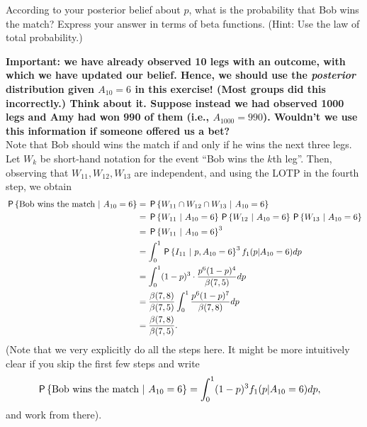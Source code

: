 \documentclass[assignments]{subfiles}
\begin{document}
\begin{exercise}
According to your posterior belief about $p$, what is the probability that Bob wins the match? Express your answer in terms of beta functions. (Hint: Use the law of total probability.)
\begin{solution}
\textbf{Important: we have already observed 10 legs with an outcome, with which we have updated our belief. Hence, we should use the \textit{posterior} distribution given $A_{10} = 6$ in this exercise! (Most groups did this incorrectly.) Think about it. Suppose instead we had observed 1000 legs and Amy had won 990 of them (i.e., $A_{1000} = 990$). Wouldn't we use this information if someone offered us a bet?}\\
Note that Bob should wins the match if and only if he wins the next three legs. Let $W_k$ be short-hand notation for the event ``Bob wins the $k$th leg''. Then, observing that $W_{11},W_{12},W_{13}$ are independent, and using the LOTP in the fourth step, we obtain
\begin{align}
    \P{ \text{Bob wins the match} \ | \ A_{10} = 6 } &= \P{ W_{11} \cap W_{12} \cap W_{13} \ | \ A_{10} = 6 } \\
    &= \P{ W_{11} \ | \ A_{10} = 6} \P{ W_{12} \ | \ A_{10} = 6} \P{ W_{13} \ | \ A_{10} = 6} \\
    &= \P{ W_{11} \ | \ A_{10} = 6}^3 \\
    &= \int_{0}^1 \P{ I_{11} \ | \ p,  A_{10} = 6}^3 f_1(p | A_{10} = 6) dp \\
    &= \int_{0}^1 (1-p)^3 \cdot \frac{p^6(1-p)^{4}}{\beta(7,5)}  dp \\
    &= \frac{\beta(7,8)}{\beta(7,5)} \int_{0}^1 \frac{p^6(1-p)^{7}}{\beta(7,8)}  dp \\
    &= \frac{\beta(7,8)}{\beta(7,5)}.
\end{align}
(Note that we very explicitly do all the steps here. It might be more intuitively clear if you skip the first few steps and write
\begin{align}
    \P{ \text{Bob wins the match} \ | \ A_{10} = 6 } &= \int_{0}^1 (1-p)^3 f_1(p | A_{10} = 6) dp,
\end{align}
and work from there).
\end{solution}
\end{exercise}
\end{document}

